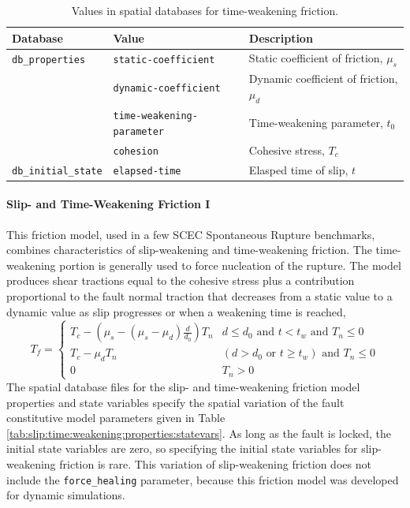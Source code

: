 \noindent \begin{center}
\begin{table}[H]
\noindent \centering{}\caption{\label{tab:time:weakening:properties:statevars}Values in spatial
databases for time-weakening friction.}
\medskip{}
\begin{tabular}{|l|l|>{\raggedright}p{2.5in}|}
\hline 
\textbf{Database} & \textbf{Value} & \textbf{Description}\tabularnewline
\hline 
\hline 
\texttt{db\_properties} & \texttt{static-coefficient} & Static coefficient of friction, $\mu_{s}$\tabularnewline
\cline{2-3} 
 & \texttt{dynamic-coefficient} & Dynamic coefficient of friction, $\mu_{d}$\tabularnewline
\cline{2-3} 
 & \texttt{time-weakening-parameter} & Time-weakening parameter, $t_{0}$\tabularnewline
\cline{2-3} 
 & \texttt{cohesion} & Cohesive stress, $T_{c}$\tabularnewline
\hline 
\texttt{db\_initial\_state} & \texttt{elapsed-time} & Elasped time of slip, $t$\tabularnewline
\hline 
\end{tabular}
\end{table}

\par\end{center}


\paragraph{\label{sec:friction:slip:time:weakening}Slip- and Time-Weakening
Friction I}

This friction model, used in a few SCEC Spontaneous Rupture benchmarks,
combines characteristics of slip-weakening and time-weakening friction.
The time-weakening portion is generally used to force nucleation of
the rupture. The model produces shear tractions equal to the cohesive
stress plus a contribution proportional to the fault normal traction
that decreases from a static value to a dynamic value as slip progresses
or when a weakening time is reached,
\begin{equation}
T_{f}=\begin{cases}
T_{c}-(\mu_{s}-(\mu_{s}-\mu_{d})\frac{d}{d_{0}})T_{n} & d\leq d_{0}\text{ and }t<t_{w}\text{ and }T_{n}\leq0\\
T_{c}-\mu_{d}T_{n} & (d>d_{0}\text{ or }t\ge t_{w})\text{ and }T_{n}\leq0\\
0 & T_{n}>0
\end{cases}
\end{equation}
The spatial database files for the slip- and time-weakening friction
model properties and state variables specify the spatial variation
of the fault constitutive model parameters given in Table \ref{tab:slip:time:weakening:properties:statevars}.
As long as the fault is locked, the initial state variables are zero,
so specifying the initial state variables for slip-weakening friction
is rare. This variation of slip-weakening friction does not include
the \texttt{force\_healing} parameter, because this friction model
was developed for dynamic simulations.

